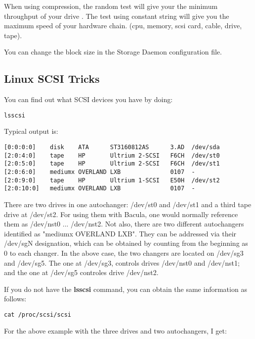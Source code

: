 When using compression, the random test will give your the minimum throughput
of your drive . The test using constant string will give you the maximum speed
of your hardware chain. (cpu, memory, scsi card, cable, drive, tape).

You can change the block size in the Storage Daemon configuration file.

\label{SCSITricks}
\subsection{Linux SCSI Tricks}

You can find out what SCSI devices you have by doing: 

\footnotesize
\begin{verbatim}
lsscsi
\end{verbatim}
\normalsize

Typical output is:

\footnotesize
\begin{verbatim}
[0:0:0:0]    disk    ATA      ST3160812AS      3.AD  /dev/sda
[2:0:4:0]    tape    HP       Ultrium 2-SCSI   F6CH  /dev/st0
[2:0:5:0]    tape    HP       Ultrium 2-SCSI   F6CH  /dev/st1
[2:0:6:0]    mediumx OVERLAND LXB              0107  -
[2:0:9:0]    tape    HP       Ultrium 1-SCSI   E50H  /dev/st2
[2:0:10:0]   mediumx OVERLAND LXB              0107  -
\end{verbatim}
\normalsize

There are two drives in one autochanger: /dev/st0 and /dev/st1
and a third tape drive at /dev/st2.  For using them with Bacula, one
would normally reference them as /dev/nst0 ... /dev/nst2.  Not also,
there are two different autochangers identified as "mediumx OVERLAND LXB".
They can be addressed via their /dev/sgN designation, which can be
obtained by counting from the beginning as 0 to each changer.  In the
above case, the two changers are located on /dev/sg3 and /dev/sg5. The one
at /dev/sg3, controls drives /dev/nst0 and /dev/nst1; and the one at
/dev/sg5 controles drive /dev/nst2.

If you do not have the {\bf lsscsi}  command, you can obtain the same
information as follows:

\footnotesize
\begin{verbatim}
cat /proc/scsi/scsi
\end{verbatim}
\normalsize

For the above example with the three drives and two autochangers,
I get:

